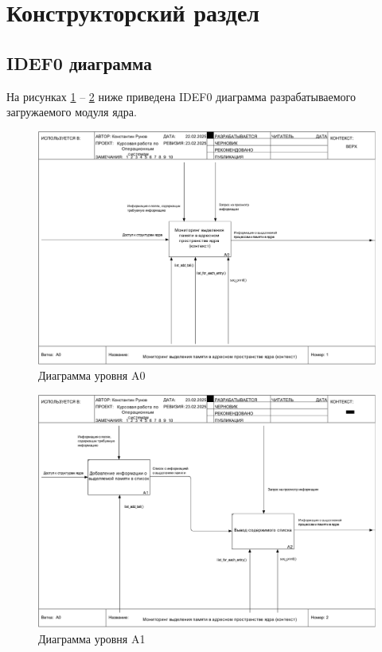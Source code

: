 \section{Конструкторский раздел}

\subsection{IDEF0 диаграмма}

На рисунках \ref{fig:a0} -- \ref{fig:a1} ниже приведена IDEF0 диаграмма разрабатываемого загружаемого модуля ядра.

\begin{figure}[H]
	\centering
	\includegraphics[width=\textwidth]{diag/idef0-A0.pdf}
	\caption{Диаграмма уровня A0}
	\label{fig:a0}
\end{figure}

\begin{figure}[H]
	\centering
	\includegraphics[width=\textwidth]{diag/idef0-A1.pdf}
	\caption{Диаграмма уровня A1}
	\label{fig:a1}
\end{figure}

